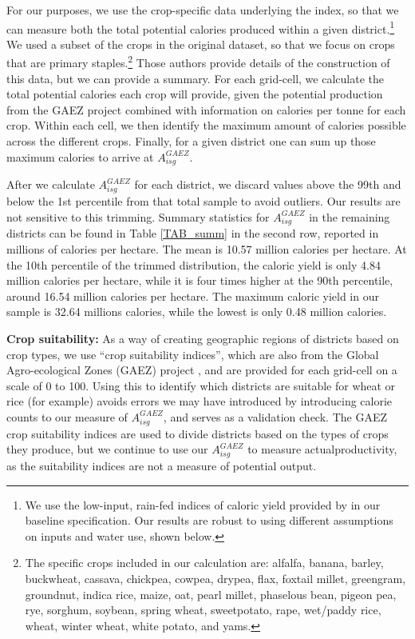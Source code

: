 \documentclass[11pt]{article}
\begin{document}
For our purposes, we use the crop-specific data underlying the \citet{galorozak2016} index, so that we can measure both the total potential calories produced within a given district.\footnote{We use the low-input, rain-fed indices of caloric yield provided by \citet{galorozak2016} in our baseline specification. Our results are robust to using different assumptions on inputs and water use, shown below.} We used a subset of the crops in the original \citet{galorozak2016} dataset, so that we focus on crops that are primary staples.\footnote{The specific crops included in our calculation are: alfalfa, banana, barley, buckwheat, cassava, chickpea, cowpea, drypea, flax, foxtail millet, greengram, groundnut, indica rice, maize, oat, pearl millet, phaselous bean, pigeon pea, rye, sorghum, soybean, spring wheat, sweetpotato, rape, wet/paddy rice, wheat, winter wheat, white potato, and yams.} Those authors provide details of the construction of this data, but we can provide a summary. For each grid-cell, we calculate the total potential calories each crop will provide, given the potential production from the GAEZ project \citep{gaez} combined with information on calories per tonne for each crop. Within each cell, we then identify the maximum amount of calories possible across the different crops. Finally, for a given district one can sum up those maximum calories to arrive at $A^{GAEZ}_{isg}$.

After we calculate $A^{GAEZ}_{isg}$ for each district, we discard values above the 99th and below the 1st percentile from that total sample to avoid outliers. Our results are not sensitive to this trimming. Summary statistics for $A^{GAEZ}_{isg}$ in the remaining districts can be found in Table \ref{TAB_summ} in the second row, reported in millions of calories per hectare. The mean is 10.57 million calories per hectare. At the 10th percentile of the trimmed distribution, the caloric yield is only 4.84 million calories per hectare, while it is four times higher at the 90th percentile, around 16.54 million calories per hectare. The maximum caloric yield in our sample is 32.64 millions calories, while the lowest is only 0.48 million calories. 

\vspace{.5cm}\noindent\textbf{Crop suitability:} As a way of creating geographic regions of districts based on crop types, we use ``crop suitability indices'', which are also from the Global Agro-ecological Zones (GAEZ) project \citep{gaez}, and are provided for each grid-cell on a scale of 0 to 100. Using this to identify which districts are suitable for wheat or rice (for example) avoids errors we may have introduced by introducing calorie counts to our measure of $A^{GAEZ}_{isg}$, and serves as a validation check. The GAEZ crop suitability indices are used to divide districts based on the types of crops they produce, but we continue to use our $A^{GAEZ}_{isg}$ to measure actualproductivity, as the suitability indices are not a measure of potential output.
\end{document}
